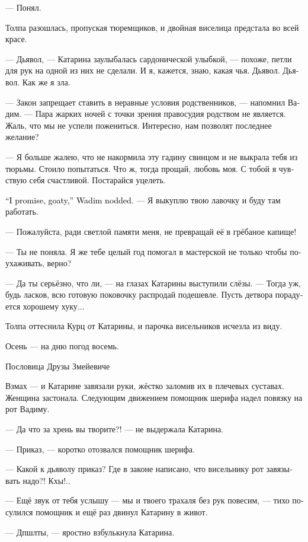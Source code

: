 \documentclass[a4paper,12pt,fleqn]{book}\usepackage{cooltooltips}\usepackage{polyglossia}\setdefaultlanguage[babelshorthands=true]{russian}\setotherlanguage{english}\defaultfontfeatures{Ligatures=TeX,Mapping=tex-text} \usepackage{xcolor}\definecolor{lightgray}{HTML}{bbbbbb}\color{lightgray}\newcommand{\ml}[3]{\textenglish{\textcolor{black}{#3}}}
\newcommand{\asterism}{\vspace{1em}{\centering\Large\bfseries$\ast~\ast~\ast$\par}\vspace{1em}}
\begin{document}
--- Понял.

Толпа разошлась, пропуская тюремщиков, и двойная виселица предстала во всей красе.

--- Дьявол, --- Катарина заулыбалась сардонической улыбкой, --- похоже, петли для рук на одной из них не сделали.
И я, кажется, знаю, какая чья.
Дьявол.
Дьявол.
Как же я зла.

--- Закон запрещает ставить в неравные условия родственников, --- напомнил Вадим.
--- Пара жарких ночей с точки зрения правосудия родством не является.
Жаль, что мы не успели пожениться.
Интересно, нам позволят последнее желание?

--- Я больше жалею, что не накормила эту гадину свинцом и не выкрала тебя из тюрьмы.
Стоило попытаться.
Что ж, тогда прощай, любовь моя.
С тобой я чувствую себя счастливой.
Постарайся уцелеть.

\ml{$0$}
{--- Обещаю, козонька, --- кивнул Вадим.}
{``I promise, goaty,'' Wadim nodded.}
--- Я выкуплю твою лавочку и буду там работать.

--- Пожалуйста, ради светлой памяти меня, не превращай её в грёбаное капище!

--- Ты не поняла.
Я же тебе целый год помогал в мастерской не только чтобы поухаживать, верно?

--- Да ты серьёзно, что ли, --- на глазах Катарины выступили слёзы.
--- Тогда уж, будь ласков, всю готовую поковочку распродай подешевле.
Пусть детвора порадуется хорошему хуку...

Толпа оттеснила Курц от Катарины, и парочка висельников исчезла из виду.

\asterism

\epigraph
{Осень --- на дню погод восемь.}
{Пословица Друзы Змейевиче}

Взмах --- и Катарине завязали руки, жёстко заломив их в плечевых суставах.
Женщина застонала.
Следующим движением помощник шерифа надел повязку на рот Вадиму.

--- Да что за хрень вы творите?! --- не выдержала Катарина.

--- Приказ, --- коротко отозвался помощник шерифа.

--- Какой к дьяволу приказ?
Где в законе написано, что висельнику рот завязывать надо?!
Кхы!..

--- Ещё звук от тебя услышу --- мы и твоего трахаля без рук повесим, --- тихо посулился помощник и ещё раз двинул Катарину в живот.

--- Дпшлты, --- яростно взбулькнула Катарина.
\end{document}
